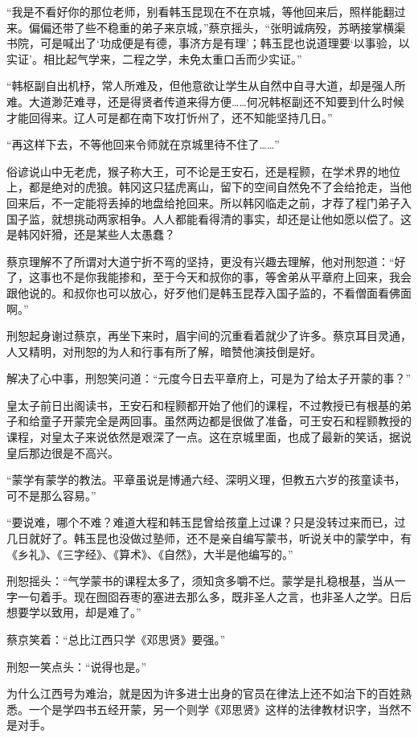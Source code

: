 “我是不看好你的那位老师，别看韩玉昆现在不在京城，等他回来后，照样能翻过来。偏偏还带了些不稳重的弟子来京城，”蔡京摇头，“张明诚病殁，苏昞接掌横渠书院，可是喊出了‘功成便是有德，事济方是有理’；韩玉昆也说道理要‘以事验，以实证’。相比起气学来，二程之学，未免太重口舌而少实证。”

“韩枢副自出机杼，常人所难及，但他意欲让学生从自然中自寻大道，却是强人所难。大道渺茫难寻，还是得贤者传道来得方便……何况韩枢副还不知要到什么时候才能回得来。辽人可是都在南下攻打忻州了，还不知能坚持几日。”

“再这样下去，不等他回来令师就在京城里待不住了……”

俗谚说山中无老虎，猴子称大王，可不论是王安石，还是程颢，在学术界的地位上，都是绝对的虎狼。韩冈这只猛虎离山，留下的空间自然免不了会给抢走，当他回来后，不一定能将丢掉的地盘给抢回来。所以韩冈临走之前，才荐了程门弟子入国子监，就想挑动两家相争。人人都能看得清的事实，却还是让他如愿以偿了。这是韩冈奸猾，还是某些人太愚蠢？

蔡京理解不了所谓对大道宁折不弯的坚持，更没有兴趣去理解，他对刑恕道：“好了，这事也不是你我能掺和，至于今天和叔你的事，等舍弟从平章府上回来，我会跟他说的。和叔你也可以放心，好歹他们是韩玉昆荐入国子监的，不看僧面看佛面啊。”

刑恕起身谢过蔡京，再坐下来时，眉宇间的沉重看着就少了许多。蔡京耳目灵通，人又精明，对刑恕的为人和行事有所了解，暗赞他演技倒是好。

解决了心中事，刑恕笑问道：“元度今日去平章府上，可是为了给太子开蒙的事？”

皇太子前日出阁读书，王安石和程颢都开始了他们的课程，不过教授已有根基的弟子和给童子开蒙完全是两回事。虽然两边都是很做了准备，可王安石和程颢教授的课程，对皇太子来说依然是艰深了一点。这在京城里面，也成了最新的笑话，据说皇后那边很是不高兴。

“蒙学有蒙学的教法。平章虽说是博通六经、深明义理，但教五六岁的孩童读书，可不是那么容易。”

“要说难，哪个不难？难道大程和韩玉昆曾给孩童上过课？只是没转过来而已，过几日就好了。韩玉昆也没做过塾师，还不是亲自编写蒙书，听说关中的蒙学中，有《乡礼》、《三字经》、《算术》、《自然》，大半是他编写的。”

刑恕摇头：“气学蒙书的课程太多了，须知贪多嚼不烂。蒙学是扎稳根基，当从一字一句着手。现在囫囵吞枣的塞进去那么多，既非圣人之言，也非圣人之学。日后想要学以致用，却是难了。”

蔡京笑着：“总比江西只学《邓思贤》要强。”

刑恕一笑点头：“说得也是。”

为什么江西号为难治，就是因为许多进士出身的官员在律法上还不如治下的百姓熟悉。一个是学四书五经开蒙，另一个则学《邓思贤》这样的法律教材识字，当然不是对手。

